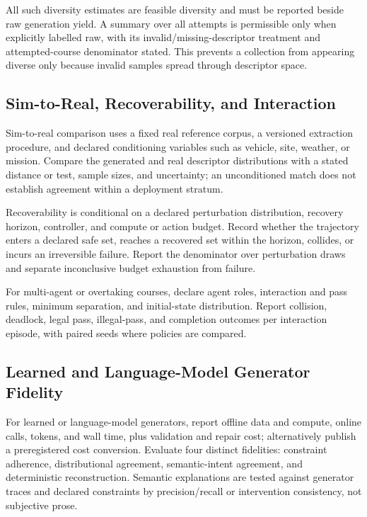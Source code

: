 All such diversity estimates are feasible diversity and must be reported beside raw
generation yield. A summary over all attempts is permissible only when explicitly
labelled raw, with its invalid/missing-descriptor treatment and attempted-course
denominator stated. This prevents a collection from appearing diverse only because
invalid samples spread through descriptor space.

\subsection{Sim-to-Real, Recoverability, and Interaction}

Sim-to-real comparison uses a fixed real reference corpus, a versioned extraction
procedure, and declared conditioning variables such as vehicle, site, weather, or
mission. Compare the generated and real descriptor distributions with a stated
distance or test, sample sizes, and uncertainty; an unconditioned match does not
establish agreement within a deployment stratum.

Recoverability is conditional on a declared perturbation distribution, recovery
horizon, controller, and compute or action budget. Record whether the trajectory enters
a declared safe set, reaches a recovered set within the horizon, collides, or incurs an
irreversible failure. Report the denominator over perturbation draws and separate
inconclusive budget exhaustion from failure.

For multi-agent or overtaking courses, declare agent roles, interaction and pass rules,
minimum separation, and initial-state distribution. Report collision, deadlock, legal
pass, illegal-pass, and completion outcomes per interaction episode, with paired seeds
where policies are compared.

\subsection{Learned and Language-Model Generator Fidelity}

For learned or language-model generators, report offline data and compute, online
calls, tokens, and wall time, plus validation and repair cost; alternatively publish a
preregistered cost conversion. Evaluate four distinct fidelities: constraint adherence,
distributional agreement, semantic-intent agreement, and deterministic reconstruction.
Semantic explanations are tested against generator traces and declared constraints by
precision/recall or intervention consistency, not subjective prose.

